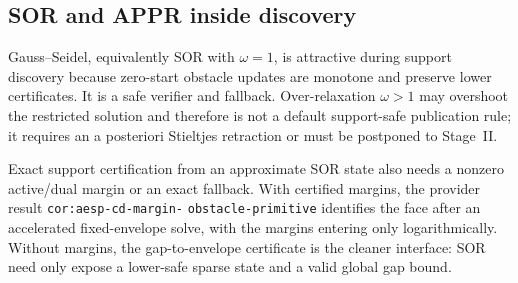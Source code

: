 \subsection{SOR and APPR inside discovery}

Gauss--Seidel, equivalently SOR with $\omega=1$, is attractive during support
discovery because zero-start obstacle updates are monotone and preserve lower
certificates.  It is a safe verifier and fallback.  Over-relaxation
$\omega>1$ may overshoot the restricted solution and therefore is not a
default support-safe publication rule; it requires an a posteriori
Stieltjes retraction or must be postponed to Stage~II.

Exact support certification from an approximate SOR state also needs a
nonzero active/dual margin or an exact fallback.  With certified margins, the
provider result \texttt{cor:aesp-cd-margin-}\allowbreak
\texttt{obstacle-primitive} identifies the
face after an accelerated fixed-envelope solve, with the margins entering
only logarithmically.  Without margins, the gap-to-envelope certificate is
the cleaner interface: SOR need only expose a lower-safe sparse state and a
valid global gap bound.
